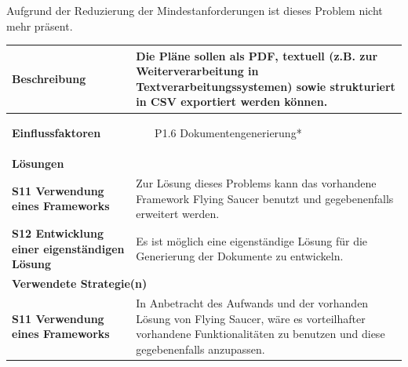 \documentclass[fontsize=12pt,paper=a4,twoside]{scrartcl}
\begin{document}
Aufgrund der Reduzierung der Mindestanforderungen ist dieses Problem nicht mehr präsent.\\

\begin{tabularx}{\textwidth}{|p{6cm}|X|}
 \hline
 \textbf{Beschreibung} & 
Die Pläne sollen als PDF, textuell (z.B. zur Weiterverarbeitung in Textverarbeitungssystemen) sowie strukturiert in CSV exportiert werden können. \\\hline
 \textbf{Einflussfaktoren} &
 \begin{itemize}
\item[P1.6] Dokumentengenerierung*
 \end{itemize}\\\hline
\multicolumn{2}{|l|}{\textbf{Lösungen}} \\\hline
\textbf{S11 Verwendung eines Frameworks} & Zur Lösung dieses Problems kann das vorhandene Framework Flying Saucer benutzt und gegebenenfalls erweitert werden. \\\hline
\textbf{S12 Entwicklung einer eigenständigen Lösung} & Es ist möglich eine eigenständige Lösung für die Generierung der Dokumente zu entwickeln. \\\hline
\multicolumn{2}{|l|}{\textbf{Verwendete Strategie(n)}} \\\hline
 \textbf{S11 Verwendung eines Frameworks}   & In Anbetracht des Aufwands und der vorhanden Lösung von Flying Saucer, wäre es vorteilhafter vorhandene Funktionalitäten zu benutzen und diese gegebenenfalls anzupassen. \\\hline
\end{tabularx}

\newpage
\end{document}
